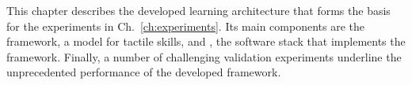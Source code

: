 This chapter describes the developed learning architecture that forms the basis for the experiments in Ch.~\ref{ch:experiments}.
Its main components are the \skillmodelabbr{} framework, a model for tactile skills, and \softwareabbr{}, the software stack that implements the \skillmodelabbr{} framework.
Finally, a number of challenging validation experiments underline the unprecedented performance of the developed framework.
